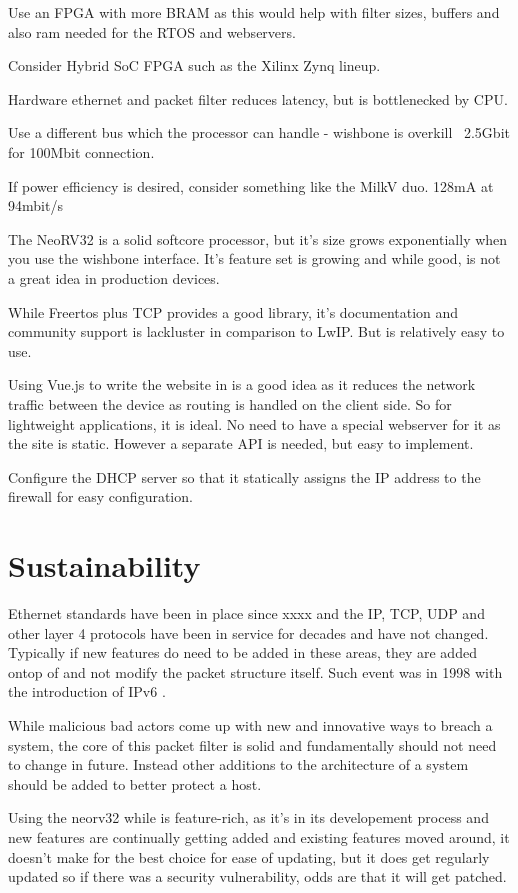 Use an FPGA with more BRAM as this would help with filter sizes, buffers and also ram needed for the RTOS and webservers.

Consider Hybrid SoC FPGA such as the Xilinx Zynq lineup.

Hardware ethernet and packet filter reduces latency, but is bottlenecked by CPU.

Use a different bus which the processor can handle - wishbone is overkill ~2.5Gbit for 100Mbit connection.

If power efficiency is desired, consider something like the MilkV duo. 128mA at 94mbit/s

The NeoRV32 is a solid softcore processor, but it's size grows exponentially when you use the wishbone interface. It's feature set is growing and while good, is not a great idea in production devices. 


While Freertos plus TCP provides a good library, it's documentation and community support is lackluster in comparison to LwIP. But is relatively easy to use. 
 
Using Vue.js to write the website in is a good idea as it reduces the network traffic between the device as routing is handled on the client side. So for lightweight applications, it is ideal. No need to have a special webserver for it as the site is static. However a separate API is needed, but easy to implement. 


Configure the DHCP server so that it statically assigns the IP address to the firewall for easy configuration. 


\section{Sustainability}

Ethernet standards have been in place since xxxx and the IP, TCP, UDP and other layer 4 protocols have been in service for decades and have not changed. Typically if new features do need to be added in these areas, they are added ontop of and not modify the packet structure itself. Such event was in 1998 with the introduction of IPv6 \cite{rfc2460}.

While malicious bad actors come up with new and innovative ways to breach a system, the core of this packet filter is solid and fundamentally should not need to change in future. Instead other additions to the architecture of a system should be added to better protect a host. 

Using the neorv32 while is feature-rich, as it's in its developement process and new features are continually getting added and existing features moved around, it doesn't make for the best choice for ease of updating, but it does get regularly updated so if there was a security vulnerability, odds are that it will get patched.

